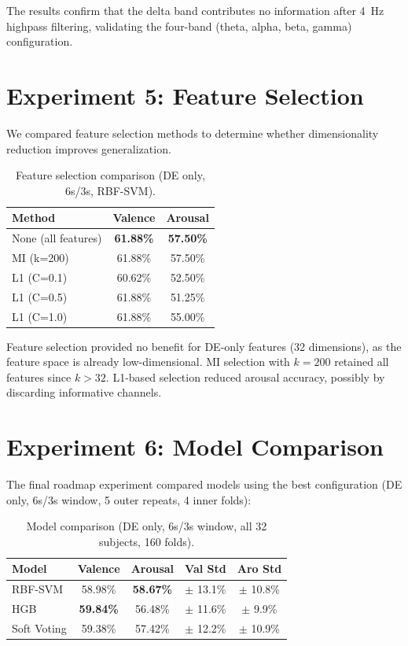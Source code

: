 \documentclass[12pt,a4paper]{report}
\begin{document}
The results confirm that the delta band contributes no information after
4~Hz highpass filtering, validating the four-band (theta, alpha, beta, gamma)
configuration.


\section{Experiment 5: Feature Selection}
\label{sec:exp_selection}

We compared feature selection methods to determine whether dimensionality
reduction improves generalization.

\begin{table}[H]
\centering
\caption{Feature selection comparison (DE only, 6s/3s, RBF-SVM).}
\label{tab:feature_selection}
\begin{tabular}{lcc}
\toprule
\textbf{Method} & \textbf{Valence} & \textbf{Arousal} \\
\midrule
None (all features) & \textbf{61.88\%} & \textbf{57.50\%} \\
MI (k=200)          & 61.88\% & 57.50\% \\
L1 (C=0.1)          & 60.62\% & 52.50\% \\
L1 (C=0.5)          & 61.88\% & 51.25\% \\
L1 (C=1.0)          & 61.88\% & 55.00\% \\
\bottomrule
\end{tabular}
\end{table}

Feature selection provided no benefit for DE-only features (32 dimensions),
as the feature space is already low-dimensional. MI selection with $k=200$
retained all features since $k > 32$. L1-based selection reduced arousal
accuracy, possibly by discarding informative channels.


\section{Experiment 6: Model Comparison}
\label{sec:exp_models}

The final roadmap experiment compared models using the best configuration
(DE only, 6s/3s window, 5 outer repeats, 4 inner folds):

\begin{table}[H]
\centering
\caption{Model comparison (DE only, 6s/3s window, all 32 subjects, 160 folds).}
\label{tab:model_comparison}
\begin{tabular}{lcccc}
\toprule
\textbf{Model} & \textbf{Valence} & \textbf{Arousal} & \textbf{Val Std} & \textbf{Aro Std} \\
\midrule
RBF-SVM     & 58.98\% & \textbf{58.67\%} & $\pm$ 13.1\% & $\pm$ 10.8\% \\
HGB         & \textbf{59.84\%} & 56.48\% & $\pm$ 11.6\% & $\pm$ 9.9\% \\
Soft Voting & 59.38\% & 57.42\% & $\pm$ 12.2\% & $\pm$ 10.9\% \\
\bottomrule
\end{tabular}
\end{table}
\end{document}
